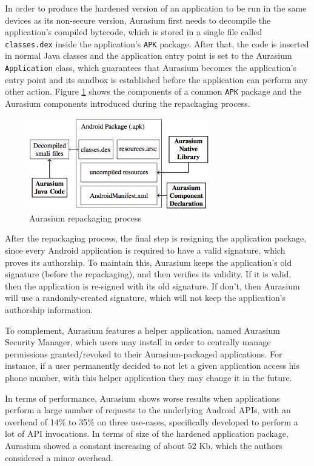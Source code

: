 In order to produce the hardened version of an application to be run in the same devices as its non-secure version, Aurasium first needs to decompile the application's compiled bytecode, which is stored in a single file called \texttt{classes.dex} inside the application's \texttt{APK} package. After that, the code is inserted in normal Java classes and the application entry point is set to the Aurasium \texttt{Application} class, which guarantees that Aurasium becomes the application's entry point and its sandbox is established before the application can perform any other action. Figure \ref{fig:aurasium-repackaging} shows the components of a common \texttt{APK} package and the Aurasium components introduced during the repackaging process.

\begin{figure}[t!]
\includegraphics[width=0.7\textwidth]{figs/aurasium-repackaging}
\centering
\caption{Aurasium repackaging process}
\label{fig:aurasium-repackaging}
\end{figure}

After the repackaging process, the final step is resigning the application package, since every Android application is required to have a valid signature, which proves its authorship. To maintain this, Aurasium keeps the application's old signature (before the repackaging), and then verifies its validity. If it is valid, then the application is re-signed with its old signature. If don't, then Aurasium will use a randomly-created signature, which will not keep the application's authorship information.

To complement, Aurasium features a helper application, named Aurasium Security Manager, which users may install in order to centrally manage permissions granted/revoked to their Aurasium-packaged applications. For instance, if a user permanently decided to not let a given application access his phone number, with this helper application they may change it in the future.

In terms of performance, Aurasium shows worse results when applications perform a large number of requests to the underlying Android APIs, with an overhead of 14\% to 35\% on three use-cases, specifically developed to perform a lot of API invocations. In terms of size of the hardened application package, Aurasium showed a constant increasing of about 52 Kb, which the authors considered a minor overhead.

